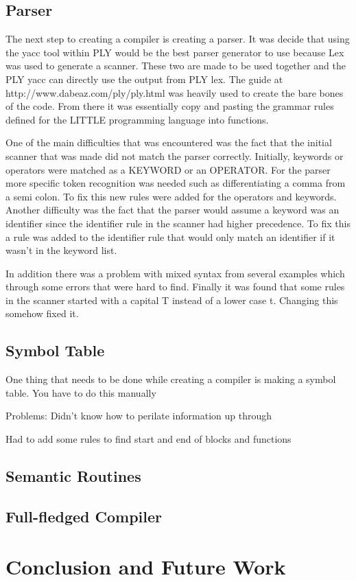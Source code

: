 \documentclass[11pt, oneside]{article}   	%
\begin{document}
	
\subsection{Parser}
The next step to creating a compiler is creating a parser. It was decide that using the yacc
tool within PLY would be the best parser generator to use because Lex was used to generate a
scanner. These two are made to be used together and the PLY yacc can directly use the output
from PLY lex. The guide at http://www.dabeaz.com/ply/ply.html was heavily used to create the
bare bones of the code. From there it was essentially copy and pasting the grammar rules defined
for the LITTLE programming language into functions.

One of the main difficulties that was encountered was the fact that the initial scanner that was
made did not match the parser correctly. Initially, keywords or operators were matched as a
KEYWORD or an OPERATOR. For the parser more specific token recognition was needed such
as differentiating a comma from a semi colon. To fix this new rules were added for the operators
and keywords. Another difficulty was the fact that the parser would assume a keyword was an
identifier since the identifier rule in the scanner had higher precedence. To fix this a rule was
added to the identifier rule that would only match an identifier if it wasn't in the keyword list.

In addition there was a problem with mixed syntax from several examples which through some
errors that were hard to find. Finally it was found that some rules in the scanner started with a
capital T instead of a lower case t. Changing this somehow fixed it.
\subsection{Symbol Table}
One thing that needs to be done while creating a compiler is making a symbol table. You have to do this manually

Problems: Didn't know how to perilate information up through

Had to add some rules to find start and end of blocks and functions

\subsection{Semantic Routines}
\subsection{Full-fledged Compiler}

\section{Conclusion and Future Work}

\end{document}
